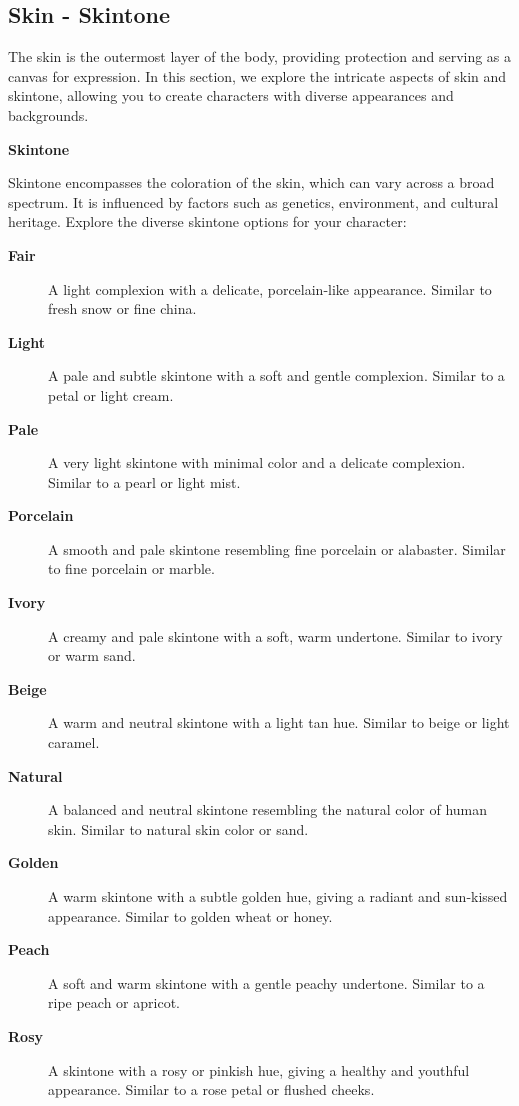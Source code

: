 \documentclass[12pt]{book}  %
\begin{document}
\subsection{\textbf{Skin  - Skintone}}

The skin is the outermost layer of the body, providing protection and serving as a canvas for expression. In this section, we explore the intricate aspects of skin and skintone, allowing you to create characters with diverse appearances and backgrounds.

\textbf{Skintone}

Skintone encompasses the coloration of the skin, which can vary across a broad spectrum. It is influenced by factors such as genetics, environment, and cultural heritage. Explore the diverse skintone options for your character:

\begin{description}
    \item[\textbf{Fair}] A light complexion with a delicate, porcelain-like appearance. Similar to fresh snow or fine china.
    \item[\textbf{Light}] A pale and subtle skintone with a soft and gentle complexion. Similar to a petal or light cream.
    \item[\textbf{Pale}] A very light skintone with minimal color and a delicate complexion. Similar to a pearl or light mist.
    \item[\textbf{Porcelain}] A smooth and pale skintone resembling fine porcelain or alabaster. Similar to fine porcelain or marble.
    \item[\textbf{Ivory}] A creamy and pale skintone with a soft, warm undertone. Similar to ivory or warm sand.
    \item[\textbf{Beige}] A warm and neutral skintone with a light tan hue. Similar to beige or light caramel.
    \item[\textbf{Natural}] A balanced and neutral skintone resembling the natural color of human skin. Similar to natural skin color or sand.
    \item[\textbf{Golden}] A warm skintone with a subtle golden hue, giving a radiant and sun-kissed appearance. Similar to golden wheat or honey.
    \item[\textbf{Peach}] A soft and warm skintone with a gentle peachy undertone. Similar to a ripe peach or apricot.
    \item[\textbf{Rosy}] A skintone with a rosy or pinkish hue, giving a healthy and youthful appearance. Similar to a rose petal or flushed cheeks.

\end{description}
\end{document}

